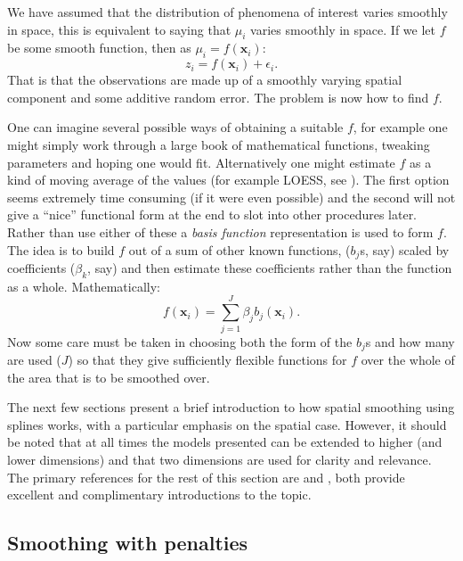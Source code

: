 We have assumed that the distribution of phenomena of interest varies smoothly in space, this is equivalent to saying that $\mu_i$ varies smoothly in space. If we let $f$ be some smooth function, then as $\mu_i = f(\mathbf{x}_i)$:
\begin{equation}
z_i = f(\mathbf{x}_i) + \epsilon_i.
\end{equation}
That is that the observations are made up of a smoothly varying spatial component and some additive random error. The problem is now how to find $f$.

One can imagine several possible ways of obtaining a suitable $f$, for example one might simply work through a large book of mathematical functions, tweaking parameters and hoping one would fit. Alternatively one might estimate $f$ as a kind of moving average of the values (for example LOESS, see \cite{loess2}). The first option seems extremely time consuming (if it were even possible) and the second will not give a ``nice'' functional form at the end to slot into other procedures later. Rather than use either of these a \textit{basis function} representation is used to form $f$. The idea is to build $f$ out of a sum of other known functions, ($b_j$s, say) scaled by coefficients ($\beta_k$, say) and then estimate these coefficients rather than the function as a whole. Mathematically:
\begin{equation}
 f(\mathbf{x}_{i}) = \sum_{j=1}^J \beta_j b_j(\mathbf{x}_{i}).
\label{intro-basisdecomp}
\end{equation}
Now some care must be taken in choosing both the form of the $b_j$s and how many are used ($J$) so that they give sufficiently flexible functions for $f$ over the whole of the area that is to be smoothed over. 

The next few sections present a brief introduction to how spatial smoothing using splines works, with a particular emphasis on the spatial case. However, it should be noted that at all times the models presented can be extended to higher (and lower dimensions) and that two dimensions are used for clarity and relevance. The primary references for the rest of this section are  and , both provide excellent and complimentary introductions to the topic.

\subsection{Smoothing with penalties}
\label{GAMpenalties}

